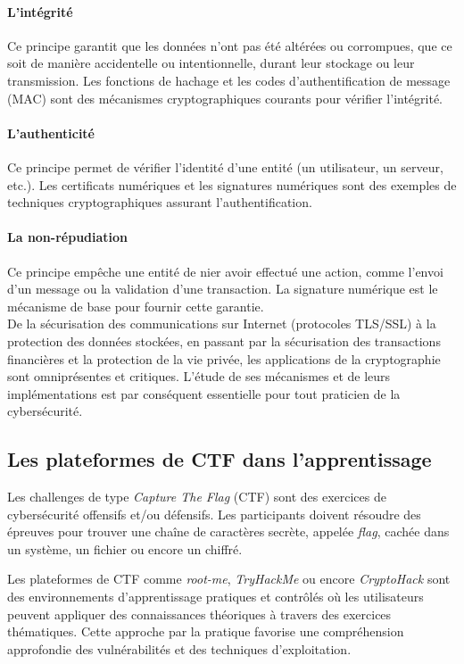 \documentclass[12pt, a4paper]{article}
\begin{document}
\paragraph{L'intégrité}
Ce principe garantit que les données n'ont pas été altérées ou corrompues, que ce soit de manière accidentelle ou intentionnelle, durant leur stockage ou leur transmission. Les fonctions de hachage et les codes d'authentification de message (MAC) sont des mécanismes cryptographiques courants pour vérifier l'intégrité.

\paragraph{L'authenticité}
Ce principe permet de vérifier l'identité d'une entité (un utilisateur, un serveur, etc.). Les certificats numériques et les signatures numériques sont des exemples de techniques cryptographiques assurant l'authentification.

\paragraph{La non-répudiation}
Ce principe empêche une entité de nier avoir effectué une action, comme l'envoi d'un message ou la validation d'une transaction. La signature numérique est le mécanisme de base pour fournir cette garantie.\\

De la sécurisation des communications sur Internet (protocoles TLS/SSL) à la protection des données stockées, en passant par la sécurisation des transactions financières et la protection de la vie privée, les applications de la cryptographie sont omniprésentes et critiques. L'étude de ses mécanismes et de leurs implémentations est par conséquent essentielle pour tout praticien de la cybersécurité.

\subsection{Les plateformes de CTF dans l'apprentissage}

Les challenges de type \textit{Capture The Flag} (CTF) sont des exercices de cybersécurité offensifs et/ou défensifs. Les participants doivent résoudre des épreuves pour trouver une chaîne de caractères secrète, appelée \textit{flag}, cachée dans un système, un fichier ou encore un chiffré.

Les plateformes de CTF comme \textit{root-me}, \textit{TryHackMe} ou encore \textit{CryptoHack} sont des environnements d'apprentissage pratiques et contrôlés où les utilisateurs peuvent appliquer des connaissances théoriques à travers des exercices thématiques. Cette approche par la pratique favorise une compréhension approfondie des vulnérabilités et des techniques d'exploitation.
\end{document}
